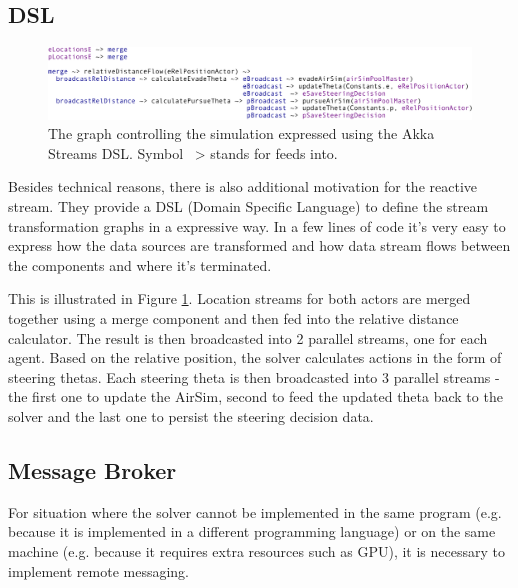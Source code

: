 \documentclass{article}
\begin{document}
\subsection{DSL}
\begin{figure}
	\centering
	\includegraphics[width=17.0cm]{streams-SDL}
	\caption{The graph controlling the simulation expressed using the Akka Streams DSL. Symbol ~> stands for feeds into.}\label{fig:streas-SDL}
\end{figure}

Besides technical reasons, there is also additional motivation for the reactive stream. They provide a DSL (Domain Specific Language) \cite{dsl-book} to define the stream transformation graphs in a expressive way. In a few lines of code it's very easy to express how the data sources are transformed and how data stream flows between the components and where it's terminated.

This is illustrated in Figure \ref{fig:streas-SDL}. Location streams for both actors are merged together using a merge component and then fed into the relative distance calculator. The result is then broadcasted into 2 parallel streams, one for each agent. Based on the relative position, the solver calculates actions in the form of steering thetas. Each steering theta is then broadcasted into 3 parallel streams - the first one to update the AirSim, second to feed the updated theta back to the solver and the last one to persist the steering decision data.









\subsection{Message Broker}
For situation where the solver cannot be implemented in the same program (e.g. because it is implemented in a different programming language) or on the same machine (e.g. because it requires extra resources such as GPU), it is necessary to implement remote messaging.
 
\end{document}
